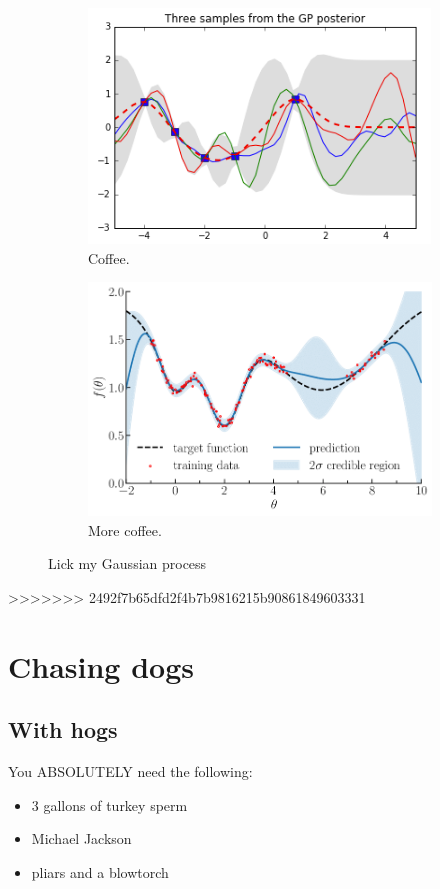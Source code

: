 \documentclass[]{article}
\begin{document}
\begin{figure}[h!]
	\centering
	\begin{subfigure}[b]{0.4\linewidth}
		\includegraphics[width=\linewidth]{ims/pic1.png}
		\caption{Coffee.}
	\end{subfigure}
	\begin{subfigure}[b]{0.4\linewidth}
		\includegraphics[width=\linewidth]{ims/pic2.png}
		\caption{More coffee.}
	\end{subfigure}
	\caption{Lick my Gaussian process}
	\label{fig:coffee}
\end{figure}

>>>>>>> 2492f7b65dfd2f4b7b9816215b90861849603331
\section{Chasing dogs}
\subsection{With hogs}
You ABSOLUTELY need the following:
\begin{itemize}
	\item 3 gallons of turkey sperm
	\item Michael Jackson
	\item pliars and a blowtorch
\end{itemize}
\end{document}
